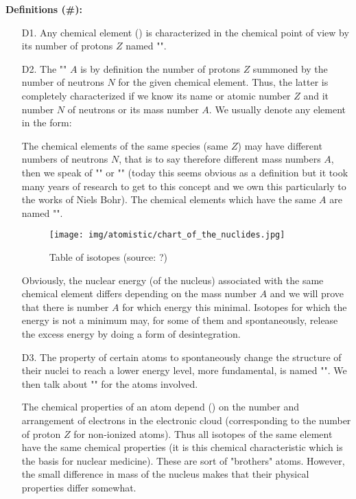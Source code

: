 	\textbf{Definitions (\#\mydef):}
	\begin{enumerate}
		\item[D1.] Any chemical element () is characterized in the chemical point of view by its number of protons $Z$ named "".
		
		\item[D2.] The "" $A$ is by definition the number of protons $Z$ summoned by the number of neutrons $N$ for the given chemical element. Thus, the latter is completely characterized if we know its name or atomic number $Z$ and it  number $N$ of neutrons or its mass number $A$. We usually denote any element in the form:
		
		The chemical elements of the same species (same $Z$) may have different numbers of neutrons $N$, that is to say therefore different mass numbers $A$, then we speak of "\label{isotope}" or "" (today this seems obvious as a definition but it took many years of research to get to this concept and we own this particularly to the works of Niels Bohr). The chemical elements which have the same $A$ are named "".
		\begin{figure}[H]
		\centering
		\texttt{[image: img/atomistic/chart\_of\_the\_nuclides.jpg]}	
		\caption[Table of isotopes]{Table of isotopes (source: ?)}
	\end{figure}
		Obviously, the nuclear energy (of the nucleus) associated with the same chemical element differs depending on the mass number $A$ and we will prove that there is number $A$ for which energy this minimal. Isotopes for which the energy is not a minimum may, for some of them and spontaneously, release the excess energy by doing a form of desintegration.
		
		\item[D3.] The property of certain atoms to spontaneously change the structure of their nuclei to reach a lower energy level, more fundamental, is named "". We then talk about "" for the atoms involved.
		
		The chemical properties of an atom depend () on the number and arrangement of electrons in the electronic cloud (corresponding to the number of proton $Z$ for non-ionized atoms). Thus all isotopes of the same element have the same chemical properties (it is this chemical characteristic which is the basis for nuclear medicine). These are sort of "brothers" atoms. However, the small difference in mass of the nucleus makes that their physical properties differ somewhat.
		

\end{enumerate}
